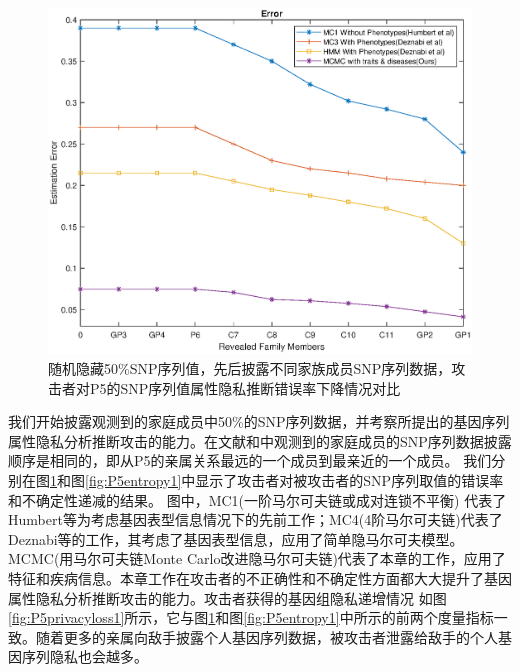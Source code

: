 \begin{figure}[htbp]
	\centering
	\includegraphics[width=0.8\linewidth]{./figures/P5error1.eps}
	\centering
	\caption{随机隐藏50\%SNP序列值，先后披露不同家族成员SNP序列数据，攻击者对P5的SNP序列值属性隐私推断错误率下降情况对比}\label{fig:P5error1}
\end{figure}


我们开始披露观测到的家庭成员中50\%的SNP序列数据，并考察所提出的基因序列属性隐私分析推断攻击的能力。在文献\cite{humbert2013addressing,humbert2017quantifying}和\cite{deznabi2018inference}中观测到的家庭成员的SNP序列数据披露顺序是相同的，即从P5的亲属关系最远的一个成员到最亲近的一个成员。 我们分别在图\ref{fig:P5error1}和图\ref{fig:P5entropy1}中显示了攻击者对被攻击者的SNP序列取值的错误率和不确定性递减的结果。 图中，MC1(一阶马尔可夫链或成对连锁不平衡) 代表了Humbert等为考虑基因表型信息情况下的先前工作；MC4(4阶马尔可夫链)代表了Deznabi等的工作，其考虑了基因表型信息，应用了简单隐马尔可夫模型。MCMC(用马尔可夫链Monte Carlo改进隐马尔可夫链)代表了本章的工作，应用了特征和疾病信息。本章工作在攻击者的不正确性和不确定性方面都大大提升了基因属性隐私分析推断攻击的能力。攻击者获得的基因组隐私递增情况 如图\ref{fig:P5privacyloss1}所示，它与图\ref{fig:P5error1}和图\ref{fig:P5entropy1}中所示的前两个度量指标一致。随着更多的亲属向敌手披露个人基因序列数据，被攻击者泄露给敌手的个人基因序列隐私也会越多。

